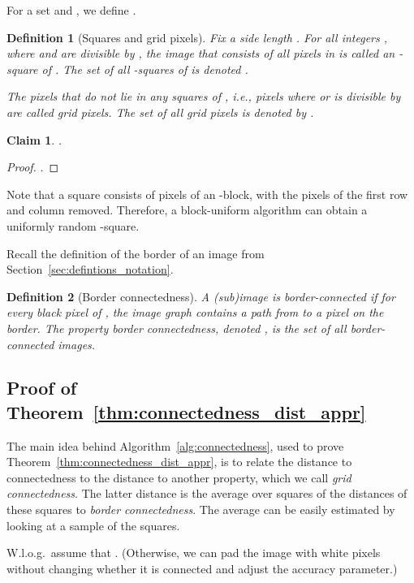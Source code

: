 \documentclass[11pt,english]{article}
\newtheorem{claim}[theorem]{Claim}
\newtheorem{definition}{Definition}[section]
\numberwithin{figure}{section}
\newcommand{\rblock}{-block\xspace}
\begin{document}
For a set  and , we define
.

\begin{definition}[Squares and grid pixels]\label{def:squares} Fix a side length .
For all integers , where  and  are divisible by , the  image that
consists of all pixels in  is called an {\em -square} of . The set of all -squares of  is denoted .

The pixels that do not lie in any squares of , i.e., pixels  where  or  is divisible by  are called {\em grid pixels}. The set of all grid pixels is denoted by .
 \end{definition}

\begin{claim}\label{claim:GP-size}
.
\end{claim}
\ifnum{}
\begin{proof}
.
\end{proof}
\fi
Note that a square consists of pixels of an \rblock, with the pixels of the first row and column removed. Therefore, a block-uniform algorithm can obtain a uniformly random -square.

Recall the definition of the border of an image from Section~\ref{sec:defintions_notation}.
\begin{definition}[Border connectedness]\label{def:border_connectedness}
A (sub)image  is {\em border-connected} if for every black pixel  of , the image graph  contains a path from  to a pixel on the border. The property
\emph{border connectedness,} denoted , is the set of all border-connected images.
\end{definition}




\ifnum{}
\subsection{Proof of Theorem~\ref{thm:connectedness_dist_appr}}\label{sec:proof_of_thm}
\fi
The main idea behind Algorithm~\ref{alg:connectedness}, used to prove Theorem~\ref{thm:connectedness_dist_appr}, is to relate the distance to connectedness to the distance to another property, which we call {\em grid connectedness}. The latter distance is the average over squares of the distances of these squares to {\em border connectedness}. The average can be easily estimated by looking at a sample of the squares.




W.l.o.g.\ assume that . (Otherwise, we can pad the image with white pixels without changing whether it is connected and adjust the accuracy parameter.)
\end{document}
